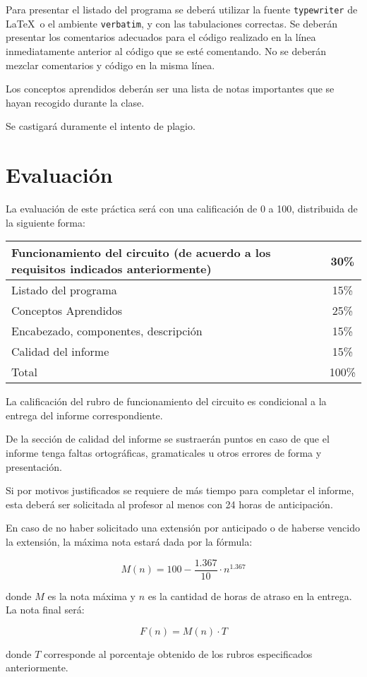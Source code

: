 \documentclass[12pt,letterpaper]{IEEEtran}
\begin{document}
Para presentar el listado del programa se deberá utilizar la fuente \texttt{typewriter} de \LaTeX\ o el ambiente \texttt{verbatim}, y con las tabulaciones correctas. Se deberán presentar los comentarios adecuados para el código realizado en la línea inmediatamente anterior al código que se esté comentando. No se deberán mezclar comentarios y código en la misma línea.

Los conceptos aprendidos deberán ser una lista de notas importantes que se hayan recogido durante la clase. 

Se castigará duramente el intento de plagio.

\section{Evaluación}

La evaluación de este práctica será con una calificación de 0 a 100, distribuida de la siguiente forma:

\begin{center}
 \begin{tabular}{p{}|c}\hline
   Funcionamiento del circuito (de acuerdo a los requisitos indicados anteriormente) 					     & 30\% \\\hline
   Listado del programa					& 15\% \\\hline
   Conceptos Aprendidos					& 25\% \\\hline
   Encabezado, componentes, descripción & 15\% \\\hline
   Calidad del informe					& 15\% \\\hline\hline
   Total								& 100\% \\
 \end{tabular}
\end{center}

La calificación del rubro de funcionamiento del circuito es condicional a la entrega del informe correspondiente.

De la sección de calidad del informe se sustraerán puntos en caso de que el informe tenga faltas ortográficas, gramaticales u otros errores de forma y presentación.

Si por motivos justificados se requiere de más tiempo para completar el informe, esta deberá ser solicitada al profesor al menos con 24 horas de anticipación.

En caso de no haber solicitado una extensión por anticipado o de haberse vencido la extensión, la máxima nota estará dada por la fórmula:

\[ M(n) = 100-\frac{1.367}{10}\cdot n^{1.367} \]

donde $M$ es la nota máxima y $n$ es la cantidad de horas de atraso en la entrega. La nota final será:

\[ F(n) = M(n)\cdot T \]

donde $T$ corresponde al porcentaje obtenido de los rubros especificados anteriormente.
\end{document}
